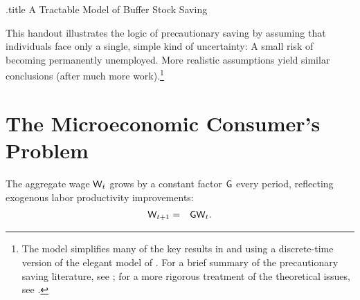 \message{ !name(TractableBufferStock.tex)}\documentclass{handout}
\begin{document}
\large


\handoutHeader
\providecommand{\dmEqZero}{\ensuremath{\Delta\mRatE=0}}
\providecommand{\dcEqZero}{\ensuremath{\Delta\cRatE=0}}



\begin{verbatimwrite}{\jobname.title}
A Tractable Model of Buffer Stock Saving
\end{verbatimwrite}

\handoutNameMake


This handout illustrates the logic of precautionary saving by assuming
that individuals face only a single, simple kind of uncertainty: A small risk of becoming permanently unemployed.  More realistic assumptions yield similar conclusions (after much more work).\footnote{The model simplifies many of the key results in \cite{carroll:brookings} and \cite{carroll:bslcpih} using a  discrete-time version of the elegant model of \cite{toche:urisk}.
  For a brief summary of the precautionary saving literature, see
  \cite{CarrollKimballPSPW}; for a more rigorous   treatment of the theoretical issues, see \cite{carrollBSTheory}.}

\section{The Microeconomic Consumer's Problem}
The aggregate wage $\mathsf{W}_{t}$ grows
by a constant factor $\mathsf{G}$ every period, reflecting exogenous labor productivity improvements:
\begin{eqnarray}
        \mathsf{W}_{t+1} & = & \mathsf{G} \mathsf{W}_{t}.
\end{eqnarray}
\end{document}
